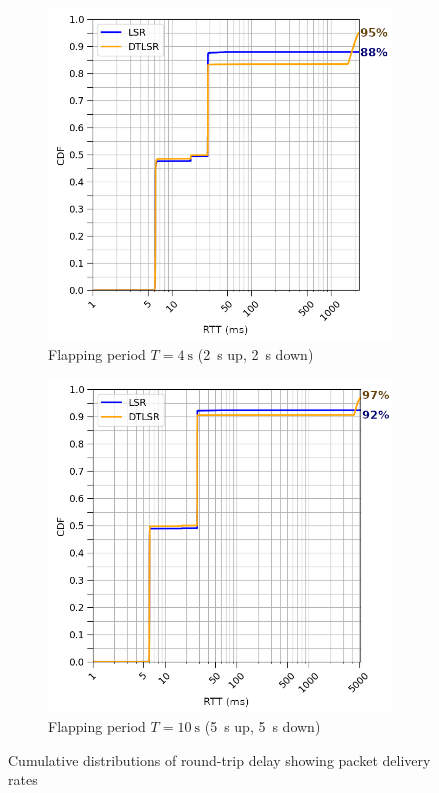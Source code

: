\documentclass[withindex,glossary,openany]{cam-thesis}
\begin{document}
\begin{figure}[h]
\centering
\begin{subfigure}{0.5\textwidth}
  \includegraphics[width=1\linewidth]{delay_box_flap2}
  \caption{Flapping period $T=\SI{4}{\s}$ (\SI{2}{\s} up, \SI{2}{\s} down)}
  \label{fig:box_2}
\end{subfigure}%
\begin{subfigure}{0.5\textwidth}
  \includegraphics[width=1\linewidth]{delay_box_flap5}
  \caption{Flapping period $T=\SI{10}{\s}$ (\SI{5}{\s} up, \SI{5}{\s} down)}
  \label{fig:box_5}
\end{subfigure}
\caption{Cumulative distributions of round-trip delay showing packet delivery rates}
\label{fig:box}
\end{figure}
\end{document}
